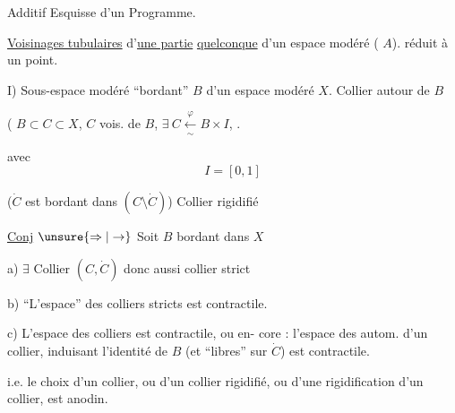 Additif Esquisse d'un Programme.

\uline{Voisinages tubulaires} d'\uline{une partie}
 \uline{quelconque} d'un
espace modéré ( $A$).  réduit à
un point.


I) Sous-espace modéré ``bordant''  $B$ d'un espace
modéré $X$. Collier autour de $B$

( $B\subset C\subset X$,
$C$ vois. de $B$, $\exists\ C\xleftarrow[\sim]{\varphi}B\times I$,
.

avec 
\[
I=[0,1]
\]



($\dot C$ est bordant dans  $(C\setminus\dot C)$)
Collier rigidifié

\uline{Conj} $\unsure{\Rightarrow|\to}$ Soit $B$ bordant dans $X$

a) $\exists$ Collier $(C,\dot C)$ donc aussi collier strict

b) ``L'espace'' des colliers stricts est contractile.

c) L'espace des 
colliers  est contractile, ou en-
core : l'espace des autom. d'un
collier, induisant l'identité de $B$
(et ``libres'' sur $\dot C$) est contractile.

i.e. le choix d'un collier, ou d'un collier  rigidifié,
ou d'une rigidification d'un collier, est
anodin.
